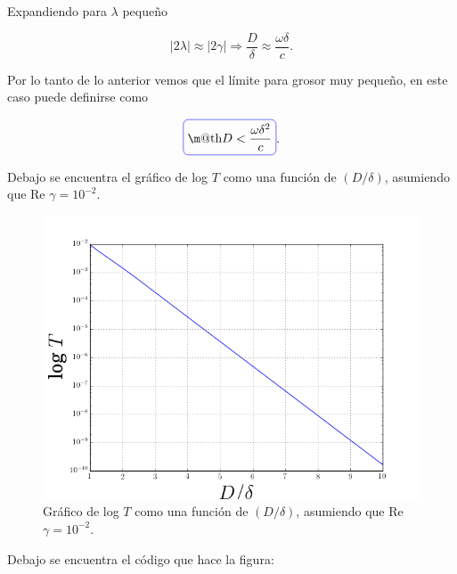 \documentclass[a4paper,11pt]{article}
\makeatletter
\numberwithin{equation}{section}
\newcommand*{\boxcolor}{blue}
\renewcommand{\boxed}[1]{\textcolor{\boxcolor}{%
\tikz[baseline={([yshift=-1ex]current bounding box.center)}] \node [rectangle, minimum width=1ex,rounded corners,draw] {\normalcolor\m@th$\displaystyle#1$};}}
\makeatother
\begin{document}
Expandiendo para $\lambda$ pequeño 

\begin{equation}
 |2 \lambda| \approx |2 \gamma| \Rightarrow \frac{D}{\delta} \approx
 \frac{\omega \delta}{c}.
\end{equation}

Por lo tanto de lo anterior vemos que el límite para grosor muy pequeño, en este 
caso puede definirse como 

\begin{equation}
 \boxed{D < \frac{\omega \delta^2}{c}}.
\end{equation}

Debajo se encuentra el gráfico de log $T$ como una función de $(D/\delta)$, 
asumiendo que Re $\gamma = 10^{-2}$. 

\begin{figure}[H]
 \center 
 \includegraphics[scale=0.5]{problema3fig1}
 \caption{Gráfico de log $T$ como una función de $(D/\delta)$, 
asumiendo que Re $\gamma = 10^{-2}$.}
\end{figure}

Debajo se encuentra el código que hace la figura:
\end{document}
